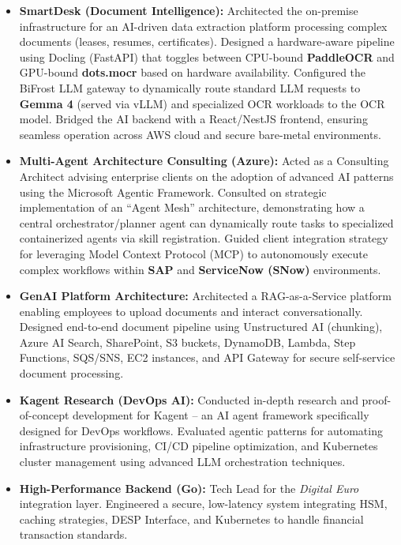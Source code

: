 \documentclass[10pt,a4paper]{article}
\providecommand{\tightlist}{%
  \setlength{\itemsep}{0pt}\setlength{\parskip}{0pt}}
\begin{document}
\begin{itemize}
\tightlist
\item
  \textbf{SmartDesk (Document Intelligence):} Architected the on-premise
  infrastructure for an AI-driven data extraction platform processing
  complex documents (leases, resumes, certificates). Designed a
  hardware-aware pipeline using Docling (FastAPI) that toggles between
  CPU-bound \textbf{PaddleOCR} and GPU-bound \textbf{dots.mocr} based on
  hardware availability. Configured the BiFrost LLM gateway to
  dynamically route standard LLM requests to \textbf{Gemma 4} (served
  via vLLM) and specialized OCR workloads to the OCR model. Bridged the
  AI backend with a React/NestJS frontend, ensuring seamless operation
  across AWS cloud and secure bare-metal environments.
\item
  \textbf{Multi-Agent Architecture Consulting (Azure):} Acted as a
  Consulting Architect advising enterprise clients on the adoption of
  advanced AI patterns using the Microsoft Agentic Framework. Consulted
  on strategic implementation of an ``Agent Mesh'' architecture,
  demonstrating how a central orchestrator/planner agent can dynamically
  route tasks to specialized containerized agents via skill
  registration. Guided client integration strategy for leveraging Model
  Context Protocol (MCP) to autonomously execute complex workflows
  within \textbf{SAP} and \textbf{ServiceNow (SNow)} environments.
\item
  \textbf{GenAI Platform Architecture:} Architected a RAG-as-a-Service
  platform enabling employees to upload documents and interact
  conversationally. Designed end-to-end document pipeline using
  Unstructured AI (chunking), Azure AI Search, SharePoint, S3 buckets,
  DynamoDB, Lambda, Step Functions, SQS/SNS, EC2 instances, and API
  Gateway for secure self-service document processing.
\item
  \textbf{Kagent Research (DevOps AI):} Conducted in-depth research and
  proof-of-concept development for Kagent -- an AI agent framework
  specifically designed for DevOps workflows. Evaluated agentic patterns
  for automating infrastructure provisioning, CI/CD pipeline
  optimization, and Kubernetes cluster management using advanced LLM
  orchestration techniques.
\item
  \textbf{High-Performance Backend (Go):} Tech Lead for the
  \emph{Digital Euro} integration layer. Engineered a secure,
  low-latency system integrating HSM, caching strategies, DESP
  Interface, and Kubernetes to handle financial transaction standards.

\end{itemize}
\end{document}
